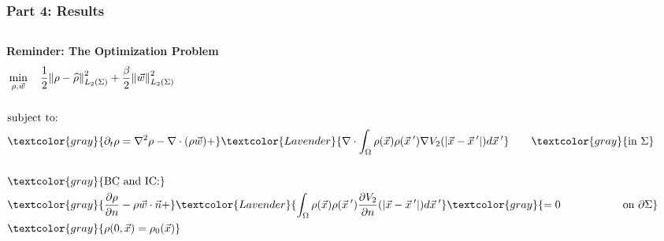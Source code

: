 \documentclass[aspectratio=169,xcolor=dvipsnames]{beamer}
\begin{document}
\begin{frame}
	\frametitle{Part 4: Results}
	\begin{columns}
	
	
	\textbf{Reminder: The Optimization Problem}
	\begin{align*}
		&\min_{\rho,\vec{w}} \quad \frac{1}{2}\norm{\rho- \widehat{\rho}}_{L_2(\Sigma)}^2 + \frac{\beta}{2} \norm{\vec{w}}_{L_2(\Sigma)}^2\\
		\\
		&\text{subject to:}
		\\
		&\textcolor{gray}{ \partial_t \rho = \nabla^2 \rho - \nabla \cdot (\rho \vec{w})+}\textcolor{Lavender}{\nabla \cdot \int_\Omega \rho(\vec{x}) \rho(\vec{x}\hspace{0.2em}') \nabla V_2(|\vec{x}-\vec{x}\hspace{0.2em}'|)d\vec{x}\hspace{0.2em}'} \qquad \textcolor{gray}{ \text{in    } \Sigma}\\
		\\
		&\textcolor{gray}{\text{BC } \text{and IC:}}\\
		&\textcolor{gray}{\frac{\partial \rho}{\partial n} - \rho \vec{w} \cdot \vec{n} +}\textcolor{Lavender}{ \int_\Omega \rho(\vec{x}) \rho(\vec{x}\hspace{0.2em}')  \frac{ \partial  V_2}{\partial n}(|\vec{x}-\vec{x}\hspace{0.2em}'|)d\vec{x}\hspace{0.2em}'} \textcolor{gray}{= 0 \quad \ \ \qquad \qquad \text{on   } \partial \Sigma  } \\
		&\textcolor{gray}{\rho(0,\vec{x}) = \rho_0(\vec{x})} 
	\end{align*}
	\vspace{-1cm}
	\begin{figure}	
		\includegraphics[width=3cm]{bloodcells.jpg}\\
		\includegraphics[width=3cm]{bacteria.png}\\			
		\includegraphics[width=3cm]{Microfilter.png}\\
		\includegraphics[width=3cm]{beer.png}
	\end{figure}
\end{columns}
\end{frame}
\end{document}
